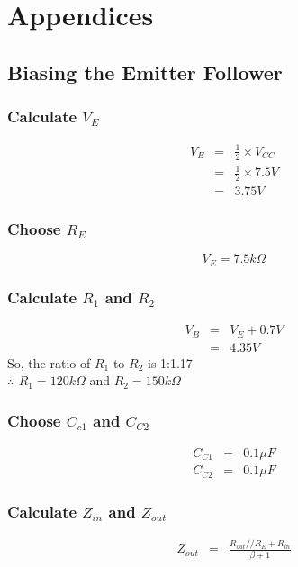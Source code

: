 \documentclass[a4paper,10pt]{report}
\begin{document}
\pagebreak
\chapter{Appendices}

\section{Biasing the Emitter Follower}
\subsection{Calculate $V_{E}$}
\begin{eqnarray*}
  V_{E} & = & \frac{1}{2} \times V_{CC} \\
  {} & = & \frac{1}{2} \times 7.5V \\
  {} & = & 3.75V
\end{eqnarray*}

\subsection{Choose $R_{E}$}
\[V_{E} = 7.5k\Omega\]

\subsection{Calculate $R_{1}$ and $R_{2}$}
\begin{eqnarray*}
  V_{B} & = & V_{E} + 0.7V \\
  {} & = & 4.35V
  \end{eqnarray*}
  So, the ratio of $R_{1}$ to  $R_{2}$ is 1:1.17 \\
  $\therefore\, \ R_{1} = 120k\Omega$ and $R_{2} = 150k\Omega$

\subsection{Choose $C_{c1}$ and $C_{C2}$}
\begin{eqnarray*}
  C_{C1} & = & 0.1 \mu F \\
  C_{C2} & = & 0.1 \mu F 
\end{eqnarray*}

\subsection{Calculate $ Z_{in}$ and $ Z_{out}$}
\begin{eqnarray*}
  Z_{out} & = &\frac{{R_{out} // {R_{E} + R_{in}}}}{{\beta + 1}} \\
\end{eqnarray*}
\end{document}
